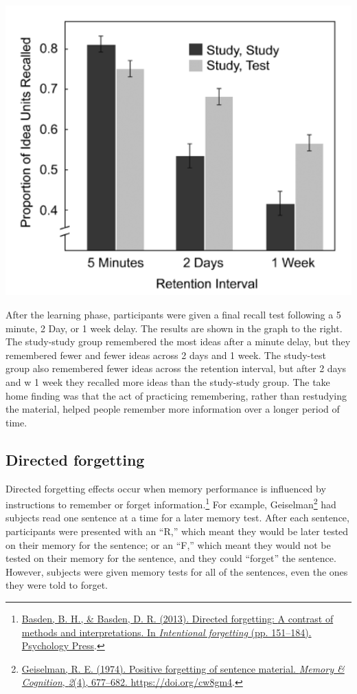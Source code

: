 \documentclass[
  oneside,
  12pt]{crumpbook}
\newenvironment{floatright50}{%
  \wrapfigure{R}{.5\textwidth}%
  }{%
  \endwrapfigure}
\begin{document}
\begin{floatright50}
\includegraphics[width=1\linewidth]{imgs/Test_enhanced}

\end{floatright50}

After the learning phase, participants were given a final recall test following a 5 minute, 2 Day, or 1 week delay. The results are shown in the graph to the right. The study-study group remembered the most ideas after a minute delay, but they remembered fewer and fewer ideas across 2 days and 1 week. The study-test group also remembered fewer ideas across the retention interval, but after 2 days and w 1 week they recalled more ideas than the study-study group. The take home finding was that the act of practicing remembering, rather than restudying the material, helped people remember more information over a longer period of time.

\hypertarget{directed-forgetting}{%
\subsection{Directed forgetting}\label{directed-forgetting}}

Directed forgetting effects occur when memory performance is influenced by instructions to remember or forget information.\footnote{\protect\hyperlink{ref-basdenDirectedForgettingContrast2013}{Basden, B. H., \& Basden, D. R. (2013). Directed forgetting: {A} contrast of methods and interpretations. In \emph{Intentional forgetting} (pp. 151--184). {Psychology Press}}.} For example, Geiselman\footnote{\protect\hyperlink{ref-geiselmanPositiveForgettingSentence1974}{Geiselman, R. E. (1974). Positive forgetting of sentence material. \emph{Memory \& Cognition}, \emph{2}(4), 677--682. \url{https://doi.org/cw8gm4}}.} had subjects read one sentence at a time for a later memory test. After each sentence, participants were presented with an ``R,'' which meant they would be later tested on their memory for the sentence; or an ``F,'' which meant they would not be tested on their memory for the sentence, and they could ``forget'' the sentence. However, subjects were given memory tests for all of the sentences, even the ones they were told to forget.
\end{document}

